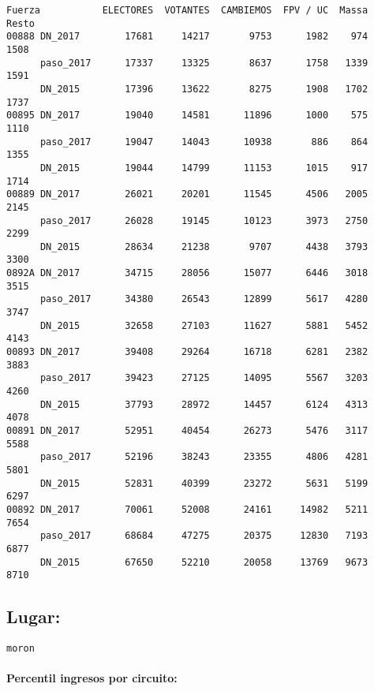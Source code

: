 \documentclass[11pt]{article}
\begin{document}
    \begin{verbatim}
Fuerza           ELECTORES  VOTANTES  CAMBIEMOS  FPV / UC  Massa  Resto
00888 DN_2017        17681     14217       9753      1982    974   1508
      paso_2017      17337     13325       8637      1758   1339   1591
      DN_2015        17396     13622       8275      1908   1702   1737
00895 DN_2017        19040     14581      11896      1000    575   1110
      paso_2017      19047     14043      10938       886    864   1355
      DN_2015        19044     14799      11153      1015    917   1714
00889 DN_2017        26021     20201      11545      4506   2005   2145
      paso_2017      26028     19145      10123      3973   2750   2299
      DN_2015        28634     21238       9707      4438   3793   3300
0892A DN_2017        34715     28056      15077      6446   3018   3515
      paso_2017      34380     26543      12899      5617   4280   3747
      DN_2015        32658     27103      11627      5881   5452   4143
00893 DN_2017        39408     29264      16718      6281   2382   3883
      paso_2017      39423     27125      14095      5567   3203   4260
      DN_2015        37793     28972      14457      6124   4313   4078
00891 DN_2017        52951     40454      26273      5476   3117   5588
      paso_2017      52196     38243      23355      4806   4281   5801
      DN_2015        52831     40399      23272      5631   5199   6297
00892 DN_2017        70061     52008      24161     14982   5211   7654
      paso_2017      68684     47275      20375     12830   7193   6877
      DN_2015        67650     52210      20058     13769   9673   8710
    \end{verbatim}

    
    \hypertarget{lugar}{%
\subsection{Lugar:}\label{lugar}}

    
    \begin{Verbatim}[commandchars=\\\{\}]
moron

    \end{Verbatim}

    \hypertarget{percentil-ingresos-por-circuito}{%
\paragraph{Percentil ingresos por
circuito:}\label{percentil-ingresos-por-circuito}}
\end{document}
